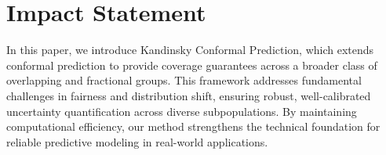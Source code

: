 \documentclass{article}
\begin{document}








\clearpage

\section*{Impact Statement}
In this paper, we introduce Kandinsky Conformal Prediction, which extends conformal prediction to provide coverage guarantees across a broader class of overlapping and fractional groups. This framework addresses fundamental challenges in fairness and distribution shift, ensuring robust, well-calibrated uncertainty quantification across diverse subpopulations. By maintaining computational efficiency, our method strengthens the technical foundation for reliable predictive modeling in real-world applications.




\newpage
\appendix


\end{document}
